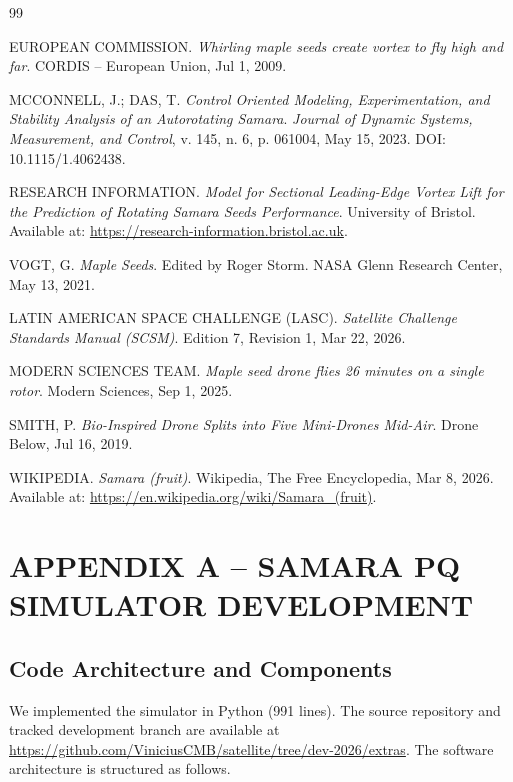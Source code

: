 \documentclass[12pt,a4paper]{article}
\begin{document}
\begin{thebibliography}{99}

EUROPEAN COMMISSION.
\textit{Whirling maple seeds create vortex to fly high and far}.
CORDIS -- European Union, Jul 1, 2009.

MCCONNELL, J.; DAS, T.
\textit{Control Oriented Modeling, Experimentation, and Stability Analysis of an Autorotating Samara}.
\textit{Journal of Dynamic Systems, Measurement, and Control}, v. 145, n. 6, p. 061004, May 15, 2023.
DOI: 10.1115/1.4062438.

RESEARCH INFORMATION.
\textit{Model for Sectional Leading-Edge Vortex Lift for the Prediction of Rotating Samara Seeds Performance}.
University of Bristol.
Available at: \url{https://research-information.bristol.ac.uk}.

VOGT, G.
\textit{Maple Seeds}.
Edited by Roger Storm.
NASA Glenn Research Center, May 13, 2021.

LATIN AMERICAN SPACE CHALLENGE (LASC).
\textit{Satellite Challenge Standards Manual (SCSM)}.
Edition 7, Revision 1, Mar 22, 2026.

MODERN SCIENCES TEAM.
\textit{Maple seed drone flies 26 minutes on a single rotor}.
Modern Sciences, Sep 1, 2025.

SMITH, P.
\textit{Bio-Inspired Drone Splits into Five Mini-Drones Mid-Air}.
Drone Below, Jul 16, 2019.

WIKIPEDIA.
\textit{Samara (fruit)}.
Wikipedia, The Free Encyclopedia, Mar 8, 2026.
Available at: \url{https://en.wikipedia.org/wiki/Samara_(fruit)}.

\end{thebibliography}

\vspace{0.5em}

\section{APPENDIX A -- SAMARA PQ SIMULATOR DEVELOPMENT}
\label{sec:appendix-simulator-development}

\subsection{Code Architecture and Components}

We implemented the simulator in Python (991 lines). The source repository and tracked development branch are available at \url{https://github.com/ViniciusCMB/satellite/tree/dev-2026/extras}. The software architecture is structured as follows.
\end{document}
